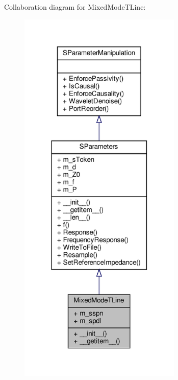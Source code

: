 Collaboration diagram for Mixed\+Mode\+T\+Line\+:\nopagebreak
\begin{figure}[H]
\begin{center}
\leavevmode
\includegraphics[width=220pt]{classSignalIntegrity_1_1SParameters_1_1Devices_1_1MixedModeTline_1_1MixedModeTLine__coll__graph}
\end{center}
\end{figure}
